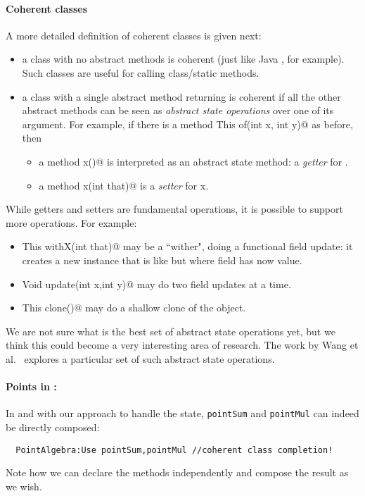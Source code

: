 \paragraph{Coherent classes} A more detailed definition of coherent
classes is given next:
\begin{itemize}
\item a class with no abstract methods is coherent (just like Java
  \Q@Math@, for example). Such classes are useful for calling class/static methods.
\item a class with a single abstract \Q@class@ method returning \Q@This@
is coherent if all the other abstract methods can be seen as \emph{abstract state
operations} over one of its argument.
For example,
if there is a \Q@class method This of(int x, int y)@ as before,
then
\begin{itemize}
\item a method \Q@int x()@ is interpreted as an abstract state method: a \emph{getter} for \Q@x@.
\item a method \Q@Void x(int that)@ is a \emph{setter} for x.
\end{itemize}
\end{itemize}
\noindent
While getters and setters are fundamental operations, it is possible to
support more operations. For example:
\begin{itemize}
\item \Q@method This withX(int that)@
may be a ``wither", doing a functional field update: it creates a new instance that is like \Q@this@ but where field \Q@x@ has now \Q@that@ value.
\item \Q@method Void update(int x,int y)@
may do two field updates at a time.
\item\Q@method This clone()@ may do a shallow clone of the object.
\end{itemize}

We are not sure what is the best set of abstract state operations yet,
but we think this could become a very interesting area of research.
The work by Wang et al.~\cite{wang2016classless} explores a particular
set of such abstract state operations.

\paragraph{Points in \name:}
In \name and with our approach to handle the state, 
\lstinline{pointSum} and \lstinline{pointMul} can indeed be directly composed:
\saveSpace
\begin{lstlisting}
  PointAlgebra:Use pointSum,pointMul //coherent class completion!
\end{lstlisting}  
\saveSpace
\noindent
  Note how we can declare the methods independently and compose the result
  as we wish. 

